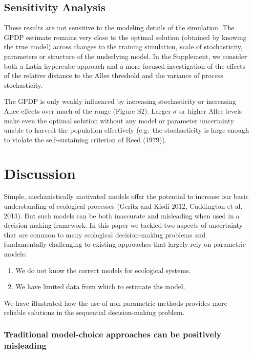 \documentclass[author-year, 12pt,review]{components/elsarticle} %
\begin{document}
\subsection{Sensitivity Analysis}\label{sensitivity-analysis}

These results are not sensitive to the modeling details of the
simulation. The GPDP estimate remains very close to the optimal solution
(obtained by knowing the true model) across changes to the training
simulation, scale of stochasticity, parameters or structure of the
underlying model. In the Supplement, we consider both a Latin hypercube
approach and a more focused investigation of the effects of the relative
distance to the Allee threshold and the variance of process
stochasticity.

The GPDP is only weakly influenced by increasing stochasticity or
increasing Allee effects over much of the range (Figure S2). Larger
$\sigma$ or higher Allee levels make even the optimal solution without
any model or parameter uncertainty unable to harvest the population
effectively (e.g.~the stochasticity is large enough to violate the
self-sustaining criterion of Reed (1979)).

\section{Discussion}\label{discussion}

Simple, mechanistically motivated models offer the potential to increase
our basic understanding of ecological processes (Geritz and Kisdi 2012,
Cuddington et al. 2013). But such models can be both inaccurate and
misleading when used in a decision making framework. In this paper we
tackled two aspects of uncertainty that are common to many ecological
decision-making problems and fundamentally challenging to existing
approaches that largely rely on parametric models:

\begin{enumerate}
\def\labelenumi{\arabic{enumi}.}
\itemsep1pt\parskip0pt
\item
  We do not know the correct models for ecological systems.
\item
  We have limited data from which to estimate the model.
\end{enumerate}

We have illustrated how the use of non-parametric methods provides more
reliable solutions in the sequential decision-making problem.

\subsubsection{Traditional model-choice approaches can be positively
misleading}\label{traditional-model-choice-approaches-can-be-positively-misleading}
\end{document}
